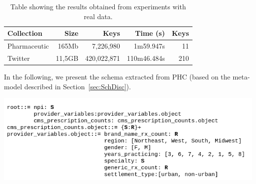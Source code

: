 

\begin{table}[!hbt]
\centering
\small
\caption{Table showing the results obtained from experiments with real data.}
\begin{tabular}{|l|r|r|r|r|}
\hline
\textbf{Collection} & \textbf{Size} & \textbf{Keys} & \textbf{Time (s)} & \textbf{Keys} \\ \hline
Pharmaceutic        & 165Mb         & 7,226,980     & 1m59.947s   & 11      \\ \hline
Twitter             & 11,5GB        & 420,022,871   & 110m46.484s & 210    \\ \hline
\end{tabular}
\label{tab:ComparaReal}
\end{table}

In the following, we present the schema extracted from PHC (based on the meta-model described in Section~\ref{sec:SchDisc}).


\noindent
\includegraphics[scale=.6]{Figures/PharmSchema.png}


